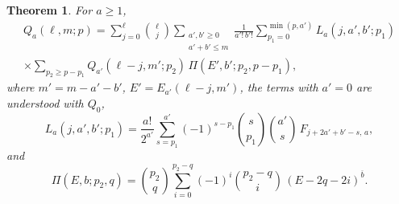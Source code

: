 \documentclass[11pt,a4paper]{article}
\newtheorem{theorem}{Theorem}[section]
\theoremstyle{definition}
\newcommand{\rise}[2]{#1^{\overline{#2}}}
\begin{document}
\begin{theorem}\label{thm:recursion}
For $a\ge1$,
\begin{multline}\label{eq:recursion}
Q_a(\ell,m;p)=\sum_{j=0}^{\ell}\binom{\ell}{j}\sum_{\substack{a',b'\ge0\\ a'+b'\le m}}\frac{1}{a'!\,b'!}
\sum_{p_1=0}^{\min(p,a')}L_a(j,a',b';p_1)\\
\times\sum_{p_2\ge p-p_1}Q_{a'}(\ell-j,m';p_2)\,\Pi(E',b';p_2,p-p_1),
\end{multline}
where $m'=m-a'-b'$, $E'=E_{a'}(\ell-j,m')$, the terms with $a'=0$ are understood with $Q_0$,
\begin{equation}\label{eq:layer}
L_a(j,a',b';p_1)=\frac{a!}{2^{a'}}\sum_{s=p_1}^{a'}(-1)^{s-p_1}\binom{s}{p_1}\binom{a'}{s}\,F_{j+2a'+b'-s,\,a},
\end{equation}
and
\begin{equation}\label{eq:placement}
\Pi(E,b;p_2,q)=\binom{p_2}{q}\sum_{i=0}^{p_2-q}(-1)^i\binom{p_2-q}{i}\,\rise{(E-2q-2i)}{b}.
\end{equation}
\end{theorem}
\end{document}
